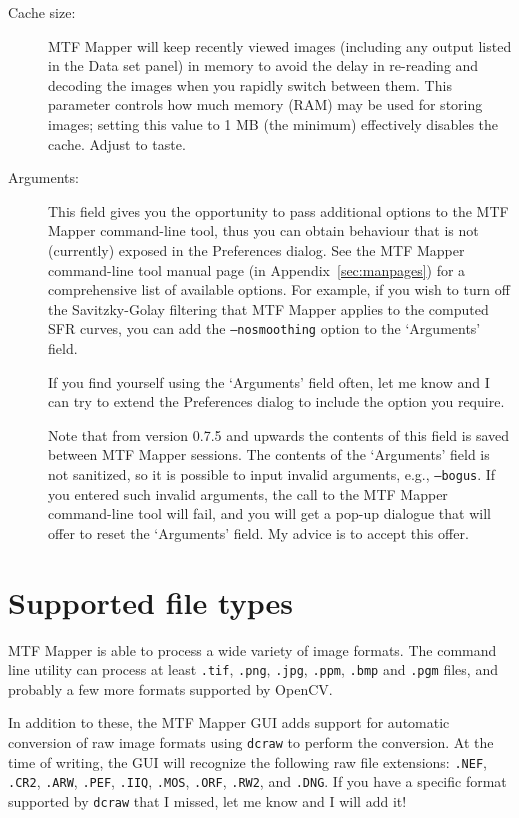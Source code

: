 \documentclass[a4paper]{article}
\begin{document}
\begin{description}
\item[Cache size:]
MTF Mapper will keep recently viewed images (including any output listed in
the \textsf{Data set} panel) in memory to avoid the delay in re-reading and
decoding the images when you rapidly switch between them. This parameter
controls how much memory (RAM) may be used for storing images; setting this
value to 1 MB (the minimum) effectively disables the cache. Adjust to taste.

\item[Arguments:]
This field gives you the opportunity to pass additional options to the MTF
Mapper command-line tool, thus you can obtain behaviour that is not
(currently) exposed in the \textsf{Preferences} dialog. See the MTF Mapper
command-line tool manual page (in Appendix~\ref{sec:manpages}) for a
comprehensive list of available options. For example, if you wish to turn
off the Savitzky-Golay filtering that MTF Mapper applies to the computed SFR
curves, you can add the \texttt{--nosmoothing} option to the `Arguments'
field.

If you find yourself using the `Arguments' field often, let me know and I
can try to extend the \textsf{Preferences} dialog to include the option you
require.

Note that from version 0.7.5 and upwards the contents of this field is saved
between MTF Mapper sessions. The contents of the `Arguments' field is not
sanitized, so it is possible to input invalid arguments, e.g.,
\texttt{--bogus}. If you entered such invalid arguments, the call to the MTF
Mapper command-line tool will fail, and you will get a pop-up dialogue that
will offer to reset the `Arguments' field. My advice is to accept this
offer.

\end{description}

\newpage

\section{Supported file types}
MTF Mapper is able to process a wide variety of image formats. The command
line utility can process at least \texttt{.tif}, \texttt{.png}, \texttt{.jpg},
\texttt{.ppm}, \texttt{.bmp} and \texttt{.pgm} files, and probably a few more formats
supported by OpenCV.

In addition to these, the MTF Mapper GUI adds support for automatic conversion of raw image
formats using \texttt{dcraw} to perform the conversion. At the time of
writing, the GUI will recognize the following raw file extensions:
\texttt{.NEF}, \texttt{.CR2}, \texttt{.ARW}, \texttt{.PEF}, \texttt{.IIQ},
\texttt{.MOS}, \texttt{.ORF}, \texttt{.RW2}, and \texttt{.DNG}. If you have
a specific format supported by \texttt{dcraw} that I missed, let me know and
I will add it!
\end{document}
